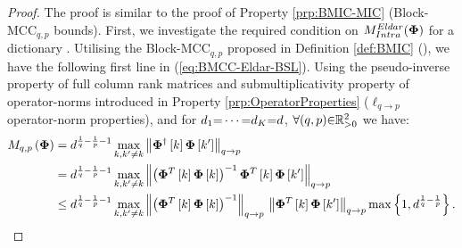 \begin{proof}
The proof is similar to the proof of Property \ref{prp:BMIC-MIC} (Block-MCC$_{q,p}$ bounds).
First, we investigate the required condition on $M^{Eldar}_{Intra}(\boldsymbol{\Phi})$ for a dictionary .
Utilising the Block-MCC$_{q,p}$ proposed in Definition \ref{def:BMIC} (\pageref{def:BMIC}), we have the following first line in (\ref{eq:BMCC-Eldar-BSL}). 
Using the pseudo-inverse property of full column rank matrices and submultiplicativity property of operator-norms introduced in Property \ref{prp:OperatorProperties} ($\ell_{q {\to} p}$ operator-norm properties), and for $d_1 {=} \cdots {=} d_K {=} d$, $\forall (q , p) {\in} \mathbb{R}^2_{>0}$ we have:
\begin{gather}
\label{eq:BMCC-Eldar-BSL} 
\begin{aligned}
M_{q,p}\left( \boldsymbol{\Phi} \right) &= d^{\frac1q - \frac1p-1} \max_{k,k' \neq k} \left\lVert\boldsymbol{\Phi}^\dagger \left[ k \right] \boldsymbol{\Phi} \left[ k' \right]\right\rVert_{q \to p} \\
&= d^{\frac1q - \frac1p-1} \max_{k,k' \neq k} \left\lVert\left( \boldsymbol{\Phi}^T \left[ k \right] \boldsymbol{\Phi}\left[ k \right] \right)^{-1}\boldsymbol{\Phi}^T \left[ k \right] \boldsymbol{\Phi} \left[ k' \right]\right\rVert_{q \to p} \\
&\leq d^{\frac1q - \frac1p-1} \max_{k,k' \neq k} \left\lVert\left( \boldsymbol{\Phi}^T \left[ k \right] \boldsymbol{\Phi} \left[ k \right] \right)^{-1}\right\rVert_{q \to p} \, \left\lVert\boldsymbol{\Phi}^T \left[ k \right] \boldsymbol{\Phi} \left[ k' \right]\right\rVert_{q \to p} \max \left\lbrace 1 , d^{\frac1q - \frac1p} \right\rbrace.
\end{aligned}
\end{gather}


\end{proof}
